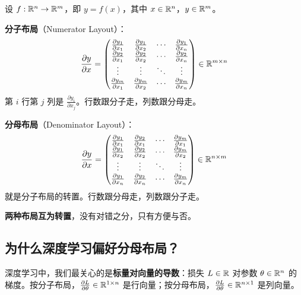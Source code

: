 \begin{definition}[雅可比矩阵的两种布局]
设 $f: \mathbb{R}^n \to \mathbb{R}^m$，即 $y = f(x)$，其中 $x \in \mathbb{R}^n$，$y \in \mathbb{R}^m$。

\textbf{分子布局}（Numerator Layout）：
\begin{equation}
\frac{\partial y}{\partial x} = \begin{pmatrix}
\frac{\partial y_1}{\partial x_1} & \frac{\partial y_1}{\partial x_2} & \cdots & \frac{\partial y_1}{\partial x_n} \\
\frac{\partial y_2}{\partial x_1} & \frac{\partial y_2}{\partial x_2} & \cdots & \frac{\partial y_2}{\partial x_n} \\
\vdots & \vdots & \ddots & \vdots \\
\frac{\partial y_m}{\partial x_1} & \frac{\partial y_m}{\partial x_2} & \cdots & \frac{\partial y_m}{\partial x_n}
\end{pmatrix} \in \mathbb{R}^{m \times n}
\end{equation}
第 $i$ 行第 $j$ 列是 $\frac{\partial y_i}{\partial x_j}$。行数跟分子走，列数跟分母走。

\textbf{分母布局}（Denominator Layout）：
\begin{equation}
\frac{\partial y}{\partial x} = \begin{pmatrix}
\frac{\partial y_1}{\partial x_1} & \frac{\partial y_2}{\partial x_1} & \cdots & \frac{\partial y_m}{\partial x_1} \\
\frac{\partial y_1}{\partial x_2} & \frac{\partial y_2}{\partial x_2} & \cdots & \frac{\partial y_m}{\partial x_2} \\
\vdots & \vdots & \ddots & \vdots \\
\frac{\partial y_1}{\partial x_n} & \frac{\partial y_2}{\partial x_n} & \cdots & \frac{\partial y_m}{\partial x_n}
\end{pmatrix} \in \mathbb{R}^{n \times m}
\end{equation}
就是分子布局的转置。行数跟分母走，列数跟分子走。
\end{definition}

\textbf{两种布局互为转置}，没有对错之分，只有方便与否。

\subsection*{为什么深度学习偏好分母布局？}

深度学习中，我们最关心的是\textbf{标量对向量的导数}：损失 $L \in \mathbb{R}$ 对参数 $\theta \in \mathbb{R}^n$ 的梯度。按分子布局，$\frac{\partial L}{\partial \theta} \in \mathbb{R}^{1 \times n}$ 是行向量；按分母布局，$\frac{\partial L}{\partial \theta} \in \mathbb{R}^{n \times 1}$ 是列向量。


